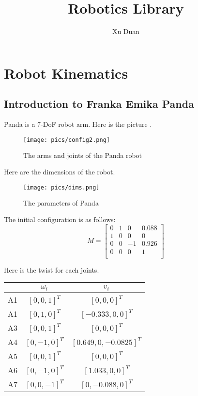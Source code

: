 \documentclass[english,10pt,a4paper]{book}
\author{Xu Duan}
\title{Robotics Library}
\begin{document}
    \maketitle
    \chapter{Robot Kinematics}
    \section{Introduction to Franka Emika Panda}
    Panda is a 7-DoF robot arm. Here is the picture \cite{franka_emika_2017}.
    \begin{figure}[H]\label{joints}
        \texttt{[image: pics/config2.png]}
        \caption{The arms and joints of the Panda robot}
    \end{figure}

    Here are the dimensions of the robot.
    \begin{figure}[H]\label{dims}
        \texttt{[image: pics/dims.png]}
        \caption{The parameters of Panda}
    \end{figure}
	
    The initial configuration is as follows:
    $$M = \begin{bmatrix}
        0 & 1 & 0 & 0.088\\
        1 & 0 & 0 & 0\\
        0 & 0 & -1 & 0.926 \\
        0 & 0 & 0 & 1 \\
    \end{bmatrix}$$
    
    Here is the twist for each joints.
    \begin{center}
        \begin{tabular}{|c|c|c|}
            \hline
            & $\omega_i$ & $v_i$ \\
            \hline
            A1 & $[0, 0, 1]^{T}$ & $[0, 0, 0]^{T}$ \\
            \hline
            A1 & $[0, 1, 0]^{T}$ & $[-0.333, 0, 0]^{T}$ \\
            \hline
            A3 & $[0, 0, 1]^{T}$ & $[0, 0, 0]^{T}$ \\
            \hline
            A4 & $[0, -1, 0]^{T}$ & $[0.649, 0, -0.0825]^{T}$ \\
            \hline
            A5 & $[0, 0, 1]^{T}$ & $[0, 0, 0]^{T}$ \\
            \hline
            A6 & $[0, -1, 0]^{T}$ & $[1.033, 0, 0]^{T}$ \\
            \hline
            A7 & $[0, 0, -1]^{T}$ & $[0, -0.088, 0]^{T}$ \\
            \hline
        \end{tabular}
    \end{center}
    
\end{document}

